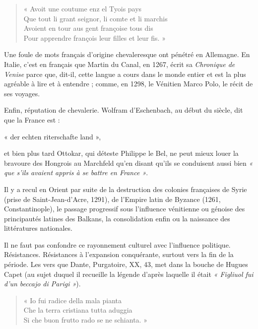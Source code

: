 \documentclass[french,twoside]{book} %
\def\bignobreak{\ifdim\lastskip<\bigskipamount
  \removelastskip\nopagebreak\bigskip\fi}
\newcommand{\labelblock}[1]{\bigbreak{\color{rubric}\noindent\textbf{#1}\par}\bignobreak}
\newenvironment{quoteblock}%
  {\begin{quoting}}
  {\end{quoting}}
\newenvironment{quotebar}{%
    \def\FrameCommand{{\color{rubric!10!}\vrule width 0.5em} \hspace{0.9em}}%
    \def\OuterFrameSep{\itemsep} %
    \MakeFramed {\advance\hsize-\width \FrameRestore}
  }%
  {%
    \endMakeFramed
  }
\renewenvironment{quoteblock}%
  {%
    \savenotes
    \setstretch{0.9}
    \begin{quotebar}
  }
  {%
    \end{quotebar}
    \spewnotes
  }
\begin{document}
\begin{verse}
« Avoit une coutume enz el Tyois pays\\
Que tout li grant seignor, li comte et li marchis\\
Avoient en tour aus gent françoise tous dis\\
Pour apprendre françois leur filles et leur fis. »\\
\end{verse}

\noindent Une foule de mots français d’origine chevaleresque ont pénétré en Allemagne. En Italie, c’est en français que Martin du Canal, en 1267, écrit sa {\itshape Chronique de Venise} parce que, dit-il, cette langue a cours dans le monde entier et est la plus agréable à lire et à entendre ; comme, en 1298, le Vénitien Marco Polo, le récit de ses voyages.\par
Enfin, réputation de chevalerie. Wolfram d’Eschenbach, au début du siècle, dit que la France est :\par

\begin{quoteblock}
\noindent « der echten riterschafte land »,\end{quoteblock}

\noindent et bien plus tard Ottokar, qui déteste Philippe le Bel, ne peut mieux  
\label{p29} louer la bravoure des Hongrois au Marchfeld qu’en disant qu’ils se conduisent aussi bien \emph{« que s’ils avaient appris à se battre en France »}.\par
Il y a recul en Orient par suite de la destruction des colonies françaises de Syrie (prise de Saint-Jean-d’Acre, 1291), de l’Empire latin de Byzance (1261, Constantinople), le passage progressif sous l’influence vénitienne ou génoise des principautés latines des Balkans, la consolidation enfin ou la naissance des littératures nationales.\par

\labelblock{— Aspect politique.}

\noindent Il ne faut pas confondre ce rayonnement culturel avec l’influence politique. Résistances. Résistances à l’expansion conquérante, surtout vers la fin de la période. Les vers que Dante, Purgatoire, XX, 43, met dans la bouche de Hugues Capet (au sujet duquel il recueille la légende d’après laquelle il était \emph{« Figliuol fui d’un beccajo di Parigi »}).\par


\begin{verse}
« Io fui radice della mala pianta\\
Che la terra cristiana tutta aduggia\\
Si che buon frutto rado se ne schianta. »\\
\end{verse}
\end{document}
